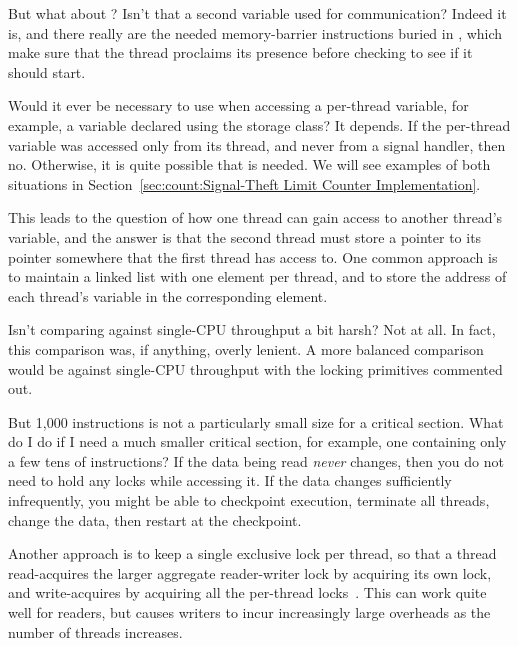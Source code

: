 	But what about ?
	Isn't that a second variable used for communication?
	Indeed it is, and there really are the needed memory-barrier
	instructions buried in ,
	which make sure that the thread proclaims its presence
	before checking to see if it should start.

\QuickQ{}
	Would it ever be necessary to use  when accessing
	a per-thread variable, for example, a variable declared using
	the   storage class?
\QuickA{}
	It depends.
	If the per-thread variable was accessed only from its thread,
	and never from a signal handler, then no.
	Otherwise, it is quite possible that  is needed.
	We will see examples of both situations in
	Section~\ref{sec:count:Signal-Theft Limit Counter Implementation}.

	This leads to the question of how one thread can gain access to
	another thread's  variable, and the answer is that
	the second thread must store a pointer to its 
	pointer somewhere that the first thread has access to.
	One common approach is to maintain a linked list with one 
	element per thread, and to store the address of each thread's
	 variable in the corresponding element.

\QuickQ{}
	Isn't comparing against single-CPU throughput a bit harsh?
\QuickA{}
	Not at all.
	In fact, this comparison was, if anything, overly lenient.
	A more balanced comparison would be against single-CPU
	throughput with the locking primitives commented out.

\QuickQ{}
	But 1,000 instructions is not a particularly small size for
	a critical section.
	What do I do if I need a much smaller critical section, for
	example, one containing only a few tens of instructions?
\QuickA{}
	If the data being read \emph{never} changes, then you do not
	need to hold any locks while accessing it.
	If the data changes sufficiently infrequently, you might be
	able to checkpoint execution, terminate all threads, change
	the data, then restart at the checkpoint.

	Another approach is to keep a single exclusive lock per
	thread, so that a thread read-acquires the larger aggregate
	reader-writer lock by acquiring its own lock, and write-acquires
	by acquiring all the per-thread locks~\cite{WilsonCHsieh92a}.
	This can work quite well for readers, but causes writers
	to incur increasingly large overheads as the number of threads
	increases.

